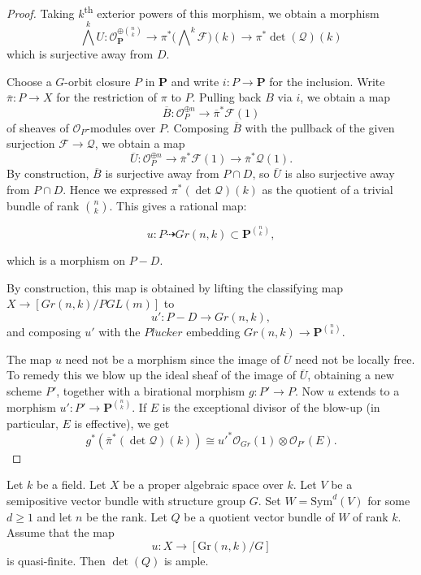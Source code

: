 \begin{proof}
Taking $k$\textsuperscript{th} exterior powers of this morphism, we obtain a
morphism
$$
  \bigwedge^k U : \mathcal{O}_{\mathbf{P}}^{\oplus \binom{n}{k}} \to
    \pi^*\big(\bigwedge\nolimits^k \mathcal{F}\big)(k) \to
    \pi^*\det(\mathcal{Q})(k)
$$
which is surjective away from $D$.

Choose a $G$-orbit closure $P$ in $\mathbf{P}$ and write $i : P \to \mathbf{P}$
for the inclusion.
Write $\overline{\pi} : P \to X$ for the restriction of $\pi$ to $P$.
Pulling back $B$ via $i$, we obtain a map
$$
  \overline{B} : \mathcal{O}_P^{\oplus n} \to \overline{\pi}^* \mathcal{F}(1)
$$
of sheaves of $\mathcal{O}_P$-modules over $P$.
Composing $\overline{B}$ with the pullback of the given surjection
$\mathcal{F} \to \mathcal{Q}$, we obtain a map
$$
  \overline{U} : \mathcal{O}_P^{\oplus n} \to
                  \overline{\pi}^*\mathcal{F}(1) \to
                  \overline{\pi}^*\mathcal{Q}(1).
$$
By construction, $\overline{B}$ is surjective away from $P\cap D$, so $\overline{U}$ is also surjective away from $P\cap D$. Hence we expressed $\pi^*(\det\mathcal{Q})(k)$ as the quotient of a trivial bundle of rank ${n\choose k}$. This gives a rational map:

$$u:P\dashrightarrow Gr(n,k)\subset \mathbf{P}^{{n\choose k}},$$

which is a morphism on $P-D$.

By construction, this map is obtained by lifting the classifying map $X\to [Gr(n,k)/PGL(m)]$ to 
$$u':P-D\to Gr(n,k),$$
and composing $u'$ with the $Pl\ddot{u}cker$ embedding $Gr(n,k)\to \mathbf{P}^{{n\choose k}}$.

The map $u$ need not be a morphism since the image of $\overline{U}$ need not be locally free. 
To remedy this we blow up the ideal sheaf of the image of $\overline{U}$, obtaining a new scheme $P'$, together with a birational morphism $g:P'\to P$. 
Now $u$ extends to a morphism $u':P'\to \mathbf{P}^{{n\choose k}}$. If $E$ is the exceptional divisor of the blow-up (in particular, $E$ is effective), we get
$$g^*(\overline{\pi}^*(\det\mathcal{Q})(k))\cong u'^*\mathcal{O}_{Gr}(1)\otimes\mathcal{O}_{P'}(E).$$

\end{proof}

\begin{lemma}
Let $k$ be a field.
Let $X$ be a proper algebraic space over $k$.
Let $V$ be a semipositive vector bundle with structure group $G$.
Set $W = \mathrm{Sym}^d(V)$ for some $d \geq 1$ and let $n$ be the rank.
Let $Q$ be a quotient vector bundle of $W$ of rank $k$.
Assume that the map
$$
u : X \to [\mathrm{Gr}(n,k)/G]
$$
is quasi-finite.
Then $\det(Q)$ is ample.
\end{lemma}

